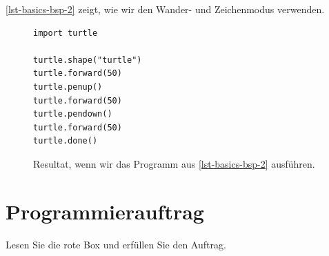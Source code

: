 \begin{example}

\autoref{lst-basics-bsp-2} zeigt, wie wir den Wander- und Zeichenmodus verwenden.

\begin{figure}[htb]
\centering
\begin{minipage}{0.5\linewidth}
\centering
\begin{lstlisting}[caption={Beispielprogramm, welches die Figur aus \autoref{figure-basics-bsp-2} zeichnet (\graybgtexttt{bsp\_2.py}).}, label=lst-basics-bsp-2]
import turtle

turtle.shape("turtle")
turtle.forward(50)
turtle.penup()
turtle.forward(50)
turtle.pendown()
turtle.forward(50)
turtle.done()
\end{lstlisting}
\end{minipage}
\hfill
\begin{minipage}[c]{0.4\linewidth}
\centering
{}
\caption{Resultat, wenn wir das Programm aus \autoref{lst-basics-bsp-2} ausführen.}
\label{figure-basics-bsp-2}
\end{minipage}
\end{figure}

\end{example}

\section{Programmierauftrag}

Lesen Sie die rote Box und erfüllen Sie den Auftrag.

